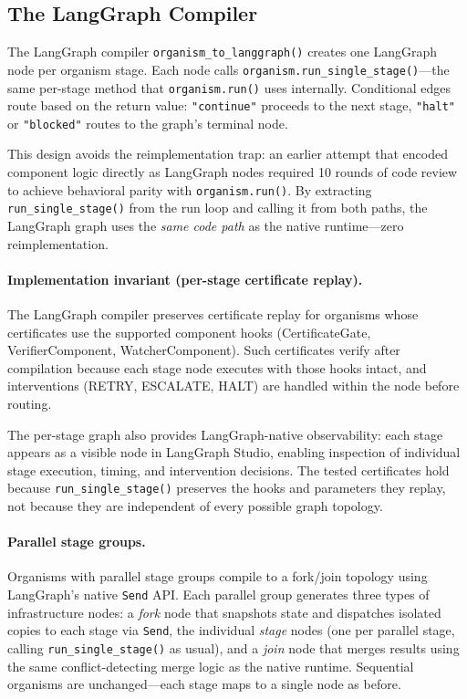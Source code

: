 \subsection{The LangGraph Compiler}

The LangGraph compiler \texttt{organism\_to\_langgraph()} creates one LangGraph node per organism stage. Each node calls \texttt{organism.run\_single\_stage()}---the same per-stage method that \texttt{organism.run()} uses internally. Conditional edges route based on the return value: \texttt{"continue"} proceeds to the next stage, \texttt{"halt"} or \texttt{"blocked"} routes to the graph's terminal node.

This design avoids the reimplementation trap: an earlier attempt that encoded component logic directly as LangGraph nodes required 10 rounds of code review to achieve behavioral parity with \texttt{organism.run()}.  By extracting \texttt{run\_single\_stage()} from the run loop and calling it from both paths, the LangGraph graph uses the \emph{same code path} as the native runtime---zero reimplementation.

\paragraph{Implementation invariant (per-stage certificate replay).}
The LangGraph compiler preserves certificate replay for organisms whose certificates use the supported component hooks (CertificateGate, VerifierComponent, WatcherComponent). Such certificates verify after compilation because each stage node executes with those hooks intact, and interventions (RETRY, ESCALATE, HALT) are handled within the node before routing.

The per-stage graph also provides LangGraph-native observability: each stage appears as a visible node in LangGraph Studio, enabling inspection of individual stage execution, timing, and intervention decisions.  The tested certificates hold because \texttt{run\_single\_stage()} preserves the hooks and parameters they replay, not because they are independent of every possible graph topology.

\paragraph{Parallel stage groups.}
Organisms with parallel stage groups compile to a fork/join topology using LangGraph's native \texttt{Send} API.  Each parallel group generates three types of infrastructure nodes: a \emph{fork} node that snapshots state and dispatches isolated copies to each stage via \texttt{Send}, the individual \emph{stage} nodes (one per parallel stage, calling \texttt{run\_single\_stage()} as usual), and a \emph{join} node that merges results using the same conflict-detecting merge logic as the native runtime.  Sequential organisms are unchanged---each stage maps to a single node as before.


